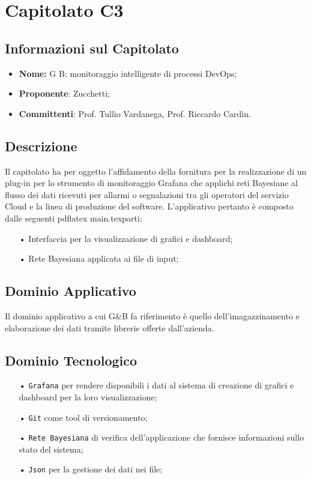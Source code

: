 \section{Capitolato C3}
\subsection{Informazioni sul Capitolato}
\begin{itemize}
	\item \textbf{Nome:} G B: monitoraggio intelligente di processi DevOps;
	\item \textbf{Proponente}: Zucchetti;
	\item \textbf{Committenti}: Prof. Tullio Vardanega, Prof. Riccardo Cardin.
\end{itemize}

\subsection{Descrizione}
Il capitolato ha per oggetto l’affidamento della fornitura per la realizzazione di un plug-in per lo
strumento di monitoraggio Grafana che applichi reti Bayesiane al flusso dei dati ricevuti per allarmi o
segnalazioni tra gli operatori del servizio Cloud e la linea di produzione del software. L'applicativo pertanto è composto dalle seguenti pdflatex main.texparti: 

\begin{itemize}

\item[•] Interfaccia per la visualizzazione di grafici e dashboard;
\item[•] Rete Bayesiana applicata ai file di input;

\end{itemize}

\subsection{Dominio Applicativo}
Il dominio applicativo a cui G&B fa riferimento è quello dell'imagazzinamento e elaborazione dei dati tramite librerie offerte dall'azienda. 

\subsection{Dominio Tecnologico}
\begin{itemize}

\item[•] \texttt{Grafana} per rendere disponibili i dati al sistema di creazione di grafici e dashboard per la loro visualizzazione;
\item[•] \texttt{Git} come tool di versionamento;
\item[•] \texttt{Rete Bayesiana} di verifica dell'applicazione che fornisce informazioni sullo stato del sistema;
\item[•] \texttt{Json} per la gestione dei dati nei file;

\end{itemize}

